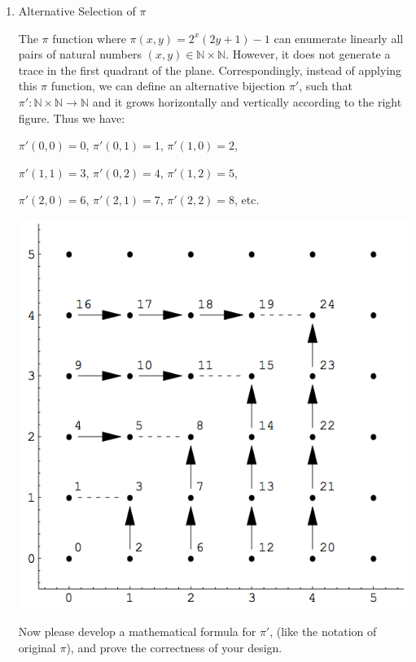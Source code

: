 \documentclass[12pt,a4paper]{article}
\theoremstyle{definition}
\numberwithin{equation}{section}
\numberwithin{figure}{section}
\begin{document}
\begin{enumerate}
\item Alternative Selection of $\pi$

  \begin{minipage}[t]{0.68\linewidth}
  The $\pi$ function where $\pi(x,y)=2^x (2y+1)-1$ can enumerate linearly all pairs of natural numbers $ (x,y) \in \mathbb{N}\times \mathbb{N}$. However, it does not generate a trace in the first quadrant of the plane. Correspondingly, instead of applying this $\pi$ function, we can define an alternative bijection $\pi'$, such that $\pi': \mathbb{N}\times \mathbb{N} \rightarrow \mathbb{N}$ and it grows horizontally and vertically according to the right figure. Thus we have:

    \vspace{1mm}
  $\pi'(0,0)=0$, $\pi'(0,1)=1$, $\pi'(1,0)=2$,

  $\pi'(1,1)=3$, $\pi'(0,2)=4$, $\pi'(1,2)=5$, 

    $\pi'(2,0)=6$, $\pi'(2,1)=7$, $\pi'(2,2)=8$, etc.
  \end{minipage}
  \hspace{1mm}
  \begin{minipage}[t]{0.32\linewidth}
  \vspace{0pt}
    \includegraphics[width=\columnwidth]{Fig-Pairing.png}
  \end{minipage}

  Now please develop a mathematical formula for $\pi'$, (like the notation of original $\pi$),  and prove the correctness of your design.


\end{enumerate}


\end{document}
